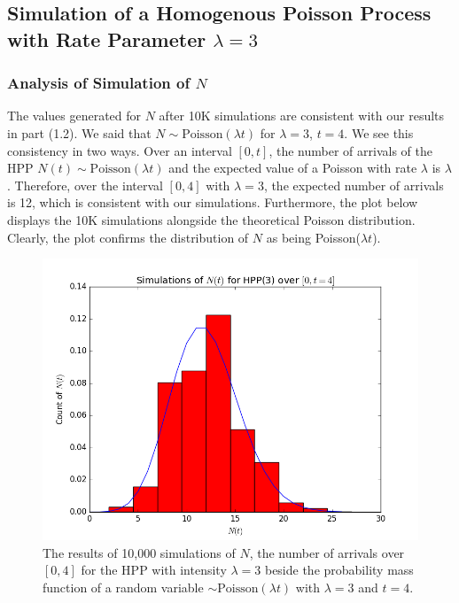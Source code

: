 \documentclass[11pt, oneside]{article}   	%
\begin{document}
\subsection{Simulation of a Homogenous Poisson Process with Rate Parameter $\lambda=3$}
\subsubsection{Analysis of Simulation of $N$}
The values generated for $N$ after 10K simulations are consistent with our results in part (1.2). We said that $N \sim \text{Poisson}(\lambda t)$ for $\lambda=3$, $t = 4$. We see this consistency in two ways. Over an interval $[0,t]$, the number of arrivals of the HPP $N(t) \sim \text{Poisson}(\lambda t)$ and the expected value of a Poisson with rate $\lambda$ is $\lambda$. Therefore, over the interval $[0,4]$ with $\lambda=3$, the expected number of arrivals is 12, which is consistent with our simulations. Furthermore, the plot below displays the 10K simulations alongside the theoretical Poisson distribution. Clearly, the plot confirms the distribution of $N$ as being Poisson($\lambda t$). 
\begin{figure}[H]
\includegraphics[scale=.5]{hpp_nt}
\caption{The results of 10,000 simulations of $N$, the number of arrivals over $[0,4]$ for the HPP with intensity $\lambda=3$ beside the probability mass function of a random variable $\sim \text{Poisson}(\lambda t)$ with $\lambda=3$ and $t=4$.}
\label{fig:x}
\end{figure}
\end{document}
